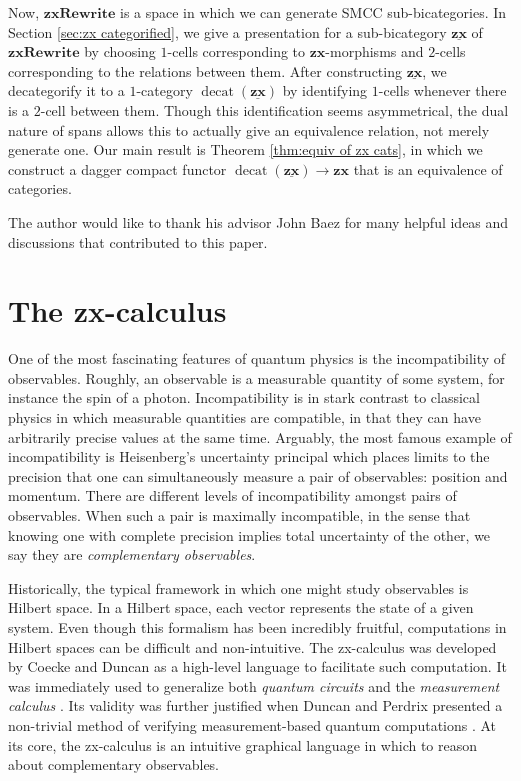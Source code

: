 \documentclass[a4paper,UKenglish]{lipics-v2016}
\begin{document}
Now, $\mathbf{zxRewrite}$ is a space in which we can generate SMCC sub-bicategories. In Section \ref{sec:zx categorified}, we give a presentation for a sub-bicategory $\underline{\mathbf{zx}}$ of $\mathbf{zxRewrite}$ by choosing $1$-cells corresponding to $\mathbf{zx}$-morphisms and $2$-cells corresponding to the relations between them.  After constructing $\underline{\mathbf{zx}}$, we decategorify it to a $1$-category $\operatorname{decat}(\underline{\mathbf{zx}})$ by identifying $1$-cells whenever there is a $2$-cell between them.  Though this identification seems asymmetrical, the dual nature of spans allows this to actually give an equivalence relation, not merely generate one.  Our main result is Theorem \ref{thm:equiv of zx cats}, in which we construct a dagger compact functor $\operatorname{decat}(\underline{\mathbf{zx}}) \to \mathbf{zx}$ that is an equivalence of categories.  

The author would like to thank his advisor John Baez for many helpful ideas and discussions that contributed to this paper.   

\section{The zx-calculus}
\label{sec:ZxCalc}

One of the most fascinating features of quantum physics is the incompatibility of observables. Roughly, an observable is a measurable quantity of some system, for instance the spin of a photon.  Incompatibility is in stark contrast to classical physics in which measurable quantities are compatible, in that they can have arbitrarily precise values at the same time.   Arguably, the most famous example of incompatibility is Heisenberg's uncertainty principal which places limits to the precision that one can simultaneously measure a pair of observables: position and momentum.  There are different levels of incompatibility amongst pairs of observables. When such a pair is maximally incompatible, in the sense that knowing one with complete precision implies total uncertainty of the other, we say they are \emph{complementary observables}.  

Historically, the typical framework in which one might study observables is Hilbert space.  In a Hilbert space, each vector represents the state of a given system. Even though this formalism has been incredibly fruitful, computations in Hilbert spaces can be difficult and non-intuitive. The zx-calculus was developed by Coecke and Duncan \cite{CoeckeDuncan_QuantumObsFullPaper} as a high-level language to facilitate such computation.  It was immediately used to generalize both \emph{quantum circuits} \cite{NielsenChuang_QuantumCompInfo}  and the \emph{measurement calculus} \cite{DanosKashefiPanang_MeasurementCalc}. Its validity was further justified when Duncan and Perdrix presented a non-trivial method of verifying measurement-based quantum computations \cite{DuncanPerdrix_RewritingQuantumCompu}.  At its core, the zx-calculus is an intuitive graphical language in which to reason about complementary observables. 
\end{document}
